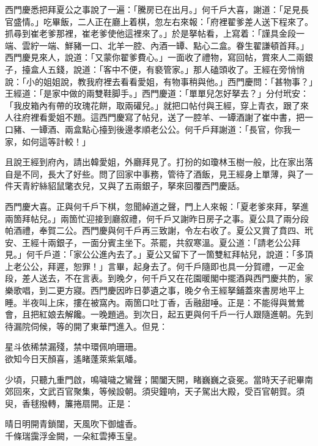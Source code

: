西門慶悉把拜夏公之事說了一遍：「騰房已在出月。」何千戶大喜，謝道：「足見長官盛情。」吃畢飯，二人正在廳上着棋，忽左右來報：「府裡翟爹差人送下程來了。抓尋到崔老爹那裡，崔老爹使他這裡來了。」{}於是拏帖看，上寫着：「謹具金段一端、雲紵一端、鮮豬一口、北羊一腔、內酒一罈、點心二盒。眷生翟謙頓首拜。」西門慶見來人，說道：「又蒙你翟爹費心。」一面收了禮物，寫回帖，賞來人二兩銀子，擡盒人五錢，說道：「客中不便，有褻管家。」那人磕頭收了。王經在旁悄悄說：「小的姐姐說，教我府裡去看看愛姐，有物事稍與他。」西門慶問：「甚物事？」王經道：「是家中做的兩雙鞋脚手。」西門慶道：「單單兒怎好拏去？」分付玳安：「我皮箱內有帶的玫瑰花餅，取兩礶兒。」{}就把口帖付與王經，穿上青衣，跟了來人往府裡看愛姐不題。這西門慶寫了帖兒，送了一腔羊、一罈酒謝了崔中書，把一口豬、一罈酒、兩盒點心擡到後邊孝順老公公。何千戶拜謝道：「長官，你我一家，如何這等計較！」

且說王經到府內，請出韓愛姐，外廳拜見了。打扮的如瓊林玉樹一般，比在家出落自是不同，長大了好些。問了回家中事務，管待了酒飯，見王經身上單薄，與了一件天青紵絲貂鼠氅衣兒，又與了五兩銀子，拏來回覆西門慶話。

西門慶大喜。正與何千戶下棋，忽聞綽道之聲，門上人來報：「夏老爹來拜，拏進兩箇拜帖兒。」兩箇忙迎接到廳叙禮，何千戶又謝昨日房子之事。夏公具了兩分段帕酒禮，奉賀二公。西門慶與何千戶再三致謝，令左右收了。夏公又賞了賁四、玳安、王經十兩銀子，一面分賓主坐下。茶罷，共叙寒溫。夏公道：「請老公公拜見。」何千戶道：「家公公進內去了。」夏公又留下了一箇雙紅拜帖兒，說道：「多頂上老公公，拜遲，恕罪！」言畢，起身去了。何千戶隨即也具一分賀禮，一疋金段，差人送去，不在言表。到晚夕，何千戶又在花園暖閣中擺酒與西門慶共酌，家樂歌唱，到二更方寢。西門慶因昨日夢遺之事，晚夕令王經拏鋪蓋來書房地平上睡。半夜叫上床，摟在被窩內。{}兩箇口吐丁香，舌融甜唾。正是：不能得與鶯鶯會，且把紅娘去解饞。一晚題過。到次日，起五更與何千戶一行人跟隨進朝。先到待漏院伺候，等的開了東華門進入。但見：

\begin{myquote}
星斗依稀禁漏殘，禁中環佩响珊珊。\\欲知今日天顏喜，遙睹蓬萊紫氣皤。
\end{myquote}

少頃，只聽九重門啟，鳴噦噦之鸞聲；閶闔天開，睹巍巍之袞冕。當時天子祀畢南郊回來，文武百官聚集，等候設朝。須臾鐘响，天子駕出大殿，受百官朝賀。須臾，香毬撥轉，簾捲扇開。正是：

\begin{myquote}
晴日明開青鎖闥，天風吹下御爐香。\\千條瑞靄浮金闕，一朵紅雲捧玉皇。
\end{myquote}

